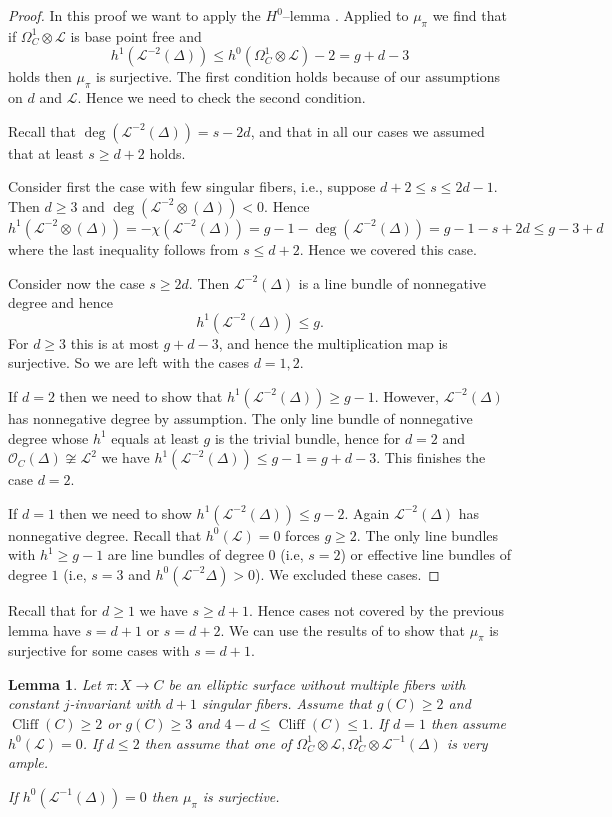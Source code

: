 \documentclass{amsart}
\newcommand{\cL}{\mathcal{L}}
\newcommand{\cO}{\mathcal{O}}
\newtheorem{lemma}[theorem]{Lemma}
\theoremstyle{definition}
\theoremstyle{remark}
\DeclareMathOperator{\Cliff}{Cliff}
\begin{document}
\begin{proof}
In this proof we want to apply the  $H^0$--lemma \cite[Theorem 4.e.1]{GreenKos}. Applied to $\mu_\pi$ we find that if 
 $\Omega^1_C\otimes \cL$ is base point free and
\[ h^1 (\cL^{-2}(\Delta))\leq h^0(\Omega^1_C\otimes \cL)-2=g+d-3\]
holds then $\mu_\pi$ is surjective. The first condition holds because of our assumptions on $d$ and $\cL$. Hence we need to check the second condition.

Recall that $\deg(\cL^{-2}(\Delta))=s-2d$, and that in all our cases we assumed that at least $s\geq d+2$ holds.

Consider first the case with few singular fibers, i.e., suppose  $d+2\leq s \leq 2d-1$. Then $d\geq 3$ and  $\deg (\cL^{-2}\otimes(\Delta))<0$. Hence
\[ h^1 (\cL^{-2}\otimes(\Delta))= -\chi(\cL^{-2}(\Delta))=g-1-\deg(\cL^{-2}(\Delta))=g-1-s+2d\leq g-3+d\]
where the last inequality follows from $s\leq d+2$. Hence we covered this case.

Consider now the case $s\geq 2d$. Then $\cL^{-2}(\Delta)$ is a line bundle of nonnegative degree and hence
\[ h^1(\cL^{-2}(\Delta))\leq g.\]
For  $d\geq 3$ this is at most $g+d-3$, and hence the multiplication map is surjective. So we are left with the cases $d=1,2$.

If $d=2$ then we need to show that $h^1(\cL^{-2}(\Delta))\geq g-1$. However, $\cL^{-2}(\Delta)$ has nonnegative degree by assumption. The only line bundle of nonnegative degree whose $h^1$ equals at least $g$ is the trivial bundle, hence for $d=2$ and $\cO_C(\Delta)\not \cong\cL^2$ we have $h^1(\cL^{-2}(\Delta))\leq g-1 =g+d-3$. This finishes the case $d=2$.

If $d=1$ then we need to show $h^1(\cL^{-2}(\Delta))\leq g-2$. Again $\cL^{-2}(\Delta)$ has nonnegative degree. Recall that $h^0(\cL)=0$ forces $g\geq 2$.
The only line bundles with $h^1\geq g-1$ are line bundles of degree $0$ (i.e, $s=2$) or effective line bundles of degree $1$ (i.e, $s=3$ and $h^0(\cL^{-2}\Delta)>0$). We excluded these cases.
\end{proof}

Recall that for $d\geq 1$ we have $s\geq d+1$. Hence cases not covered by the previous lemma have $s=d+1$ or $s=d+2$. We can use  the results of \cite{ButMult} to show that $\mu_\pi$ is surjective for some cases with $s=d+1$.

\begin{lemma} \label{lemKosVanB} Let $\pi: X \to C$ be an elliptic surface without multiple fibers with constant $j$-invariant with $d+1$ singular fibers.
Assume that $g(C)\geq 2$ and $\Cliff(C)\geq 2$ or $g(C)\geq 3$ and $4-d\leq \Cliff(C)\leq 1$. If $d=1$ then assume $h^0(\cL)=0$. If $d\leq 2$ then assume that one of $\Omega^1_C \otimes \cL, \Omega^1_C\otimes \cL^{-1}(\Delta)$ is very ample.

If $h^0(\cL^{-1}(\Delta))=0$ then   $\mu_\pi$ is surjective.
 \end{lemma}
 
\end{document}
